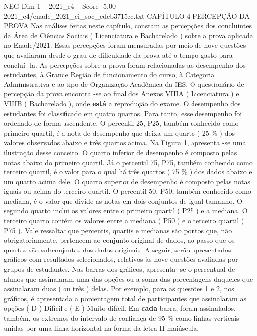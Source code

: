 \begin{textsample}{NEG Dim 1 – 2021\_c4 – Score -5.00 – 2021\_c4/enade\_2021\_ci\_soc\_edcb3715cc.txt}  \label{ex:f1_neg_070}
CAPÍTULO 4 PERCEPÇÃO DA PROVA Nas análises feitas neste capítulo, constam as percepções dos concluintes da Área de Ciências Sociais ( Licenciatura e Bacharelado ) sobre a prova aplicada no Enade/2021.
Essas percepções foram mensuradas por meio de nove questões que avaliaram desde o grau de dificuldade da prova até o tempo gasto para concluí -la.
As percepções sobre a prova foram relacionadas ao desempenho dos estudantes, à Grande Região de funcionamento do curso, à Categoria Administrativa e ao tipo de Organização Acadêmica da IES.
O questionário de percepção da prova encontra -se ao final dos Anexos VIIIA ( Licenciatura ) e VIIIB ( Bacharelado ), onde \textbf{está} a reprodução do exame.
O desempenho dos estudantes foi classificado em quatro quartos.
Para tanto, esse desempenho foi ordenado de forma ascendente.
O percentil 25, P25, também conhecido como primeiro quartil, é a nota de desempenho que deixa um quarto ( 25 \% ) dos valores observados abaixo e três quartos acima.
Na Figura 1, apresenta -se uma ilustração desse conceito.
O quarto inferior de desempenho é composto pelas notas abaixo do primeiro quartil.
Já o percentil 75, P75, também conhecido como terceiro quartil, é o valor para o qual há três quartos ( 75 \% ) dos dados abaixo e um quarto acima dele.
O quarto superior de desempenho é composto pelas notas iguais ou acima do terceiro quartil.
O percentil 50, P50, também conhecido como mediana, é o valor que divide as notas em dois conjuntos de igual tamanho.
O segundo quarto inclui os valores entre o primeiro quartil ( P25 ) e a mediana.
O terceiro quarto contém os valores entre a mediana ( P50 ) e o terceiro quartil ( P75 ).
Vale ressaltar que percentis, quartis e medianas são pontos que, não obrigatoriamente, pertencem ao conjunto original de dados, ao passo que os quartos são subconjuntos dos dados originais.
A seguir, serão apresentados gráficos com resultados selecionados, relativos às nove questões avaliadas por grupos de estudantes.
Nas barras dos gráficos, apresenta -se o percentual de alunos que assinalaram uma das opções ou a soma das porcentagens daqueles que assinalaram duas ( ou três ) delas.
Por exemplo, para as questões 1 e 2, nos gráficos, é apresentada a porcentagem total de participantes que assinalaram as opções ( D ) Difícil e ( E ) Muito difícil.
Em \textbf{cada} barra, foram assinalados, também, os extremos do intervalo de confiança de 95 \% como linhas verticais unidas por uma linha horizontal na forma da letra H maiúscula.

\end{textsample}
